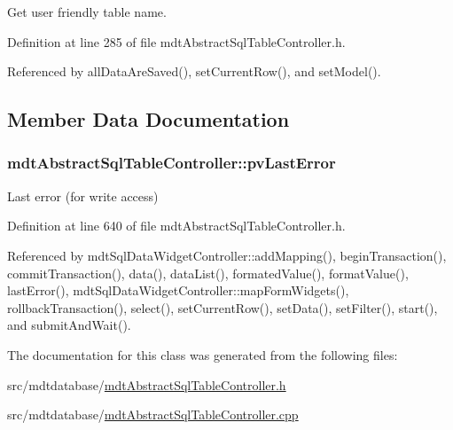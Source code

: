 Get user friendly table name. 



Definition at line 285 of file mdt\-Abstract\-Sql\-Table\-Controller.\-h.



Referenced by all\-Data\-Are\-Saved(), set\-Current\-Row(), and set\-Model().



\subsection{Member Data Documentation}
\hypertarget{classmdt_abstract_sql_table_controller_ab84254456716151208b9e5eb3610a90b}{
\subsubsection[{pv\-Last\-Error}]{ mdt\-Abstract\-Sql\-Table\-Controller\-::pv\-Last\-Error\hspace{0.3cm}{\ttfamily [protected]}}}\label{classmdt_abstract_sql_table_controller_ab84254456716151208b9e5eb3610a90b}


Last error (for write access) 



Definition at line 640 of file mdt\-Abstract\-Sql\-Table\-Controller.\-h.



Referenced by mdt\-Sql\-Data\-Widget\-Controller\-::add\-Mapping(), begin\-Transaction(), commit\-Transaction(), data(), data\-List(), formated\-Value(), format\-Value(), last\-Error(), mdt\-Sql\-Data\-Widget\-Controller\-::map\-Form\-Widgets(), rollback\-Transaction(), select(), set\-Current\-Row(), set\-Data(), set\-Filter(), start(), and submit\-And\-Wait().



The documentation for this class was generated from the following files\-:\begin{DoxyCompactItemize}
\item 
src/mdtdatabase/\hyperlink{mdt_abstract_sql_table_controller_8h}{mdt\-Abstract\-Sql\-Table\-Controller.\-h}\item 
src/mdtdatabase/\hyperlink{mdt_abstract_sql_table_controller_8cpp}{mdt\-Abstract\-Sql\-Table\-Controller.\-cpp}\end{DoxyCompactItemize}
